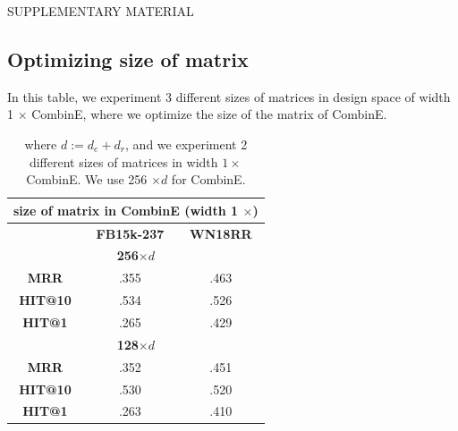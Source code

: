 \clearpage

\begin{center}
    SUPPLEMENTARY MATERIAL
\end{center}
\subsection{Optimizing size of matrix}
In this table, we experiment 3 different sizes of matrices in design space of width 1 $\times$ CombinE, where we optimize the size of the matrix of CombinE.
\begin{table}[h]
\centering
\begin{tabular}{c|c|c}
\hline
\multicolumn{3}{c}{\textbf{size of matrix in CombinE (width 1 $\times$)}}\\
\hline
 & \textbf{FB15k-237} & \textbf{WN18RR}\\
 \hline
 \multicolumn{3}{c}{\textbf{256$\times d$}}\\
 \textbf{MRR} & .355 & .463 \\
 \textbf{HIT@10} & .534 & .526 \\
 \textbf{HIT@1} & .265 & .429\\
  \hline
 \multicolumn{3}{c}{\textbf{128$\times d$}}\\
 \textbf{MRR} & .352 & .451 \\
 \textbf{HIT@10} & .530 & .520 \\
 \textbf{HIT@1} & .263 & .410 \\
\hline
\end{tabular}

\caption{where $d := d_e + d_r$, and we experiment 2 different sizes of matrices in width $1 \times$ CombinE. We use 256 $\times d$ for CombinE.}
\label{table11}
\end{table}

